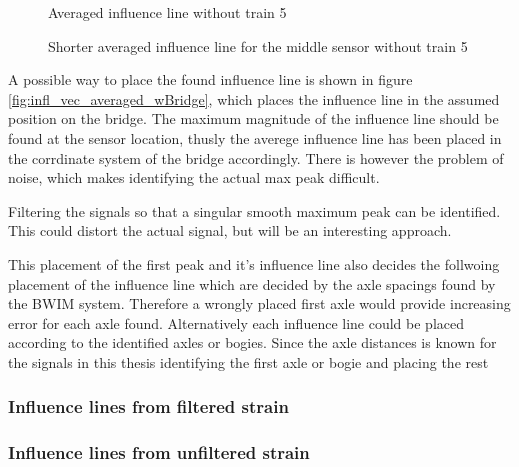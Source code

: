 \begin{figure}[H]
	\begin{adjustbox}{center}
		
	\end{adjustbox}
	\caption{Averaged influence line without train 5}
	\label{fig:infl_vec_averaged_wo_train5}
\end{figure}

\begin{figure}[H]
	\begin{adjustbox}{center}
		
	\end{adjustbox}
	\caption{Shorter averaged influence line for the middle sensor without train 5}
	\label{fig:infl_vec_averaged_fft10hz}
\end{figure}

A possible way to place the found influence line is shown in figure \ref{fig:infl_vec_averaged_wBridge}, which places the influence line in the assumed position on the bridge. The maximum magnitude of the influence line should be found at the sensor location, thusly the averege influence line has been placed in the corrdinate system of the bridge accordingly. There is however the problem of noise, which makes identifying the actual max peak difficult.

Filtering the signals so that a singular smooth maximum peak can be identified. This could distort the actual signal, but will be an interesting approach.

This placement of the first peak and it's influence line also decides the follwoing placement of the influence line which are decided by the axle spacings found by the BWIM system. Therefore a wrongly placed first axle would provide increasing error for each axle found.
Alternatively each influence line could be placed according to the identified axles or bogies. Since the axle distances is known for the signals in this thesis identifying the first axle or bogie and placing the rest
\subsubsection{Influence lines from filtered strain}

\subsubsection{Influence lines from unfiltered strain}
